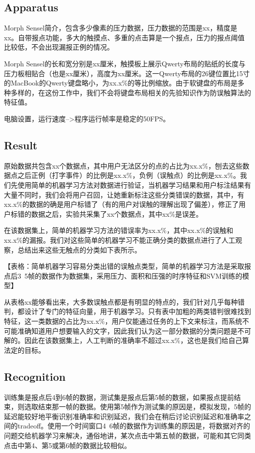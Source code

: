 \subsection{Apparatus}

Morph Sensel简介，包含多少像素的压力数据，压力数据的范围是xx，精度是xx。自带报点功能，多大的触摸点、多重的点击算是一个报点，压力的报点阈值比较低，不会出现漏报正例的情况。

Morph Sensel的长和宽分别是xx厘米，触摸板上展示Qwerty布局的贴纸的长度与压力板相贴合（也是xx厘米），高度为xx厘米。这一Qwerty布局的26键位置比15寸的MacBook的Qwerty键盘略小，为xx.x\%的等比例缩放。由于软键盘的布局是多种多样的，在这份工作中，我们不会将键盘布局相关的先验知识作为防误触算法的特征值。

电脑设置，运行速度-->程序运行帧率是稳定的50FPS。

\subsection{Result}

原始数据共包含xx个数据点，其中用户无法区分的点的占比为xx.x\%，刨去这些数据点之后正例（打字事件）的比例是xx.x\%，负例（误触点）的比例是xx.x\%。我们先使用简单的机器学习方法对数据进行验证，当机器学习结果和用户标注结果有大量不同时，我们会将用户召回，让她重新标注这些分类错误的数据，其中，有xx.x\%的数据的确是用户标错了（有的用户对误触的理解出现了偏差），修正了用户标错的数据之后，实验共采集了xx个数据点，其中xx\%是误差。

在该数据集上，简单的机器学习方法的错误率为xx.x\%，其中xx.x\%的误触和xx.x\%的漏报。我们对这些简单的机器学习不能正确分类的数据点进行了人工观察，总结出来这些无触点的分类如下表所示。

【表格：简单机器学习容易分类出错的误触点类型，简单的机器学习方法是采取报点后3~5帧的数据作为数据集，采用压力、面积和压强的时序特征和SVM训练的模型】

从表格xx能够看出来，大多数误触点都是有明显的特点的，我们针对几乎每种错判，都设计了专门的特征向量，用于机器学习。只有表中加粗的两类错判很难找到特征，这一类数据的占比为xx.x\%，用户仅能通过任务的上下文来标注，而系统不可能准确知道用户想要输入的文字，因此我们认为这一部分数据的分类问题是不可解的。因此在该数据集上，人工判断的准确率不超过xx.x\%，这也是我们给自己算法定的目标。

\subsection{Recognition}

训练集是报点后4到6帧的数据，测试集是报点后第5帧的数据，如果报点提前结束，则选取结束那一帧的数据。使用第5帧作为测试集的原因是，模拟发现，5帧的延迟能较好地平衡识别准确率和识别延迟，我们会在稍后讨论识别延迟和准确率之间的tradeoff。使用一个时间窗口4~6帧的数据作为训练集的原因是，将数据对齐的问题交给机器学习来解决，通俗地讲，某次点击中第五帧的数据，可能和其它同类点击中第4、第5或第6帧的数据比较相似。

